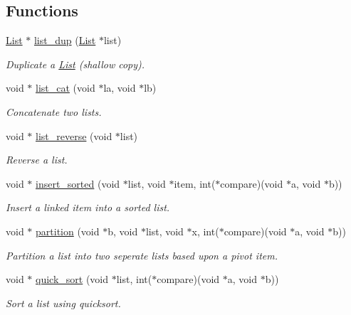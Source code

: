 \subsection*{Functions}
\begin{DoxyCompactItemize}
\item 
\hyperlink{structList}{List} $\ast$ \hyperlink{group__list__util_ga874ff33e9f0bb93fc3d7ac5ab4f3e248}{list\+\_\+dup} (\hyperlink{structList}{List} $\ast$list)
\begin{DoxyCompactList}\small\item\em Duplicate a \hyperlink{structList}{List} (shallow copy). \end{DoxyCompactList}\item 
void $\ast$ \hyperlink{group__list__util_gaeb12c90d4f427422d119991fcb361a3c}{list\+\_\+cat} (void $\ast$la, void $\ast$lb)
\begin{DoxyCompactList}\small\item\em Concatenate two lists. \end{DoxyCompactList}\item 
void $\ast$ \hyperlink{group__list__util_ga2550a2043c99ed17cee21fc253cfa8cc}{list\+\_\+reverse} (void $\ast$list)
\begin{DoxyCompactList}\small\item\em Reverse a list. \end{DoxyCompactList}\item 
void $\ast$ \hyperlink{group__list__util_gae6f4181f083344798db3d2e807d32508}{insert\+\_\+sorted} (void $\ast$list, void $\ast$item, int($\ast$compare)(void $\ast$a, void $\ast$b))
\begin{DoxyCompactList}\small\item\em Insert a linked item into a sorted list. \end{DoxyCompactList}\item 
void $\ast$ \hyperlink{group__list__util_gada9f3e39c93165f776dbe69ef07a7159}{partition} (void $\ast$b, void $\ast$list, void $\ast$x, int($\ast$compare)(void $\ast$a, void $\ast$b))
\begin{DoxyCompactList}\small\item\em Partition a list into two seperate lists based upon a pivot item. \end{DoxyCompactList}\item 
void $\ast$ \hyperlink{group__list__util_gab09951efeeb5dd1dfc3ccbf60d6d627e}{quick\+\_\+sort} (void $\ast$list, int($\ast$compare)(void $\ast$a, void $\ast$b))
\begin{DoxyCompactList}\small\item\em Sort a list using quicksort. \end{DoxyCompactList}\end{DoxyCompactItemize}


